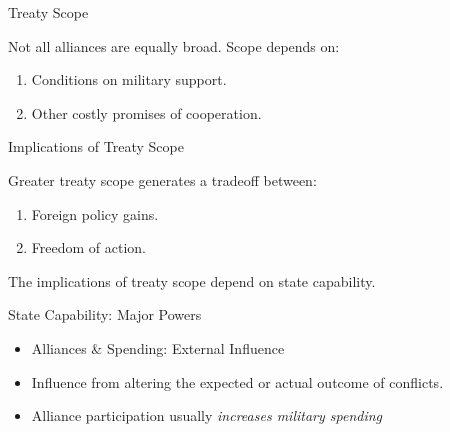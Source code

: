 \documentclass{beamer}
\begin{document}
\begin{frame}{Treaty Scope}

Not all alliances are equally broad. Scope depends on: 

\begin{enumerate} 
\pause
\item Conditions on military support. 
\pause
\item Other costly promises of cooperation. 
\end{enumerate}  

\end{frame}



\begin{frame}{Implications of Treaty Scope}

Greater treaty scope generates a tradeoff between: 

\begin{enumerate} 
\pause
\item Foreign policy gains. 
\pause
\item Freedom of action. 
\end{enumerate}  

\end{frame}


\begin{frame}[standout]

The implications of treaty scope depend on state capability. 

\end{frame}



\begin{frame}{State Capability: Major Powers}

\begin{itemize}
\item Alliances \& Spending: External Influence
\pause
\item Influence from altering the expected or actual outcome of conflicts. 
\pause 
\item Alliance participation usually \emph{increases military spending} 
\end{itemize} 


\end{frame}

\end{document}

